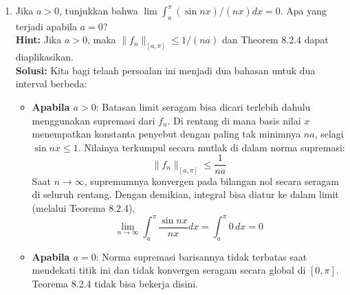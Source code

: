 ﻿\documentclass{article}
\begin{document}
\begin{enumerate}
        \vspace{0.5cm}
  \item[13.] Jika $a > 0$, tunjukkan bahwa $\lim \int_a^\pi (\sin nx) / (nx) dx = 0$. Apa yang terjadi apabila $a=0$?\\
        \textbf{Hint:} Jika $a > 0$, maka $\|f_n\|_{[a, \pi]} \le 1 / (na)$ dan Theorem 8.2.4 dapat diaplikasikan.\\
        \textbf{Solusi:}
        Kita bagi telaah persoalan ini menjadi dua bahasan untuk dua interval berbeda:
        \begin{itemize}
          \item \textbf{Apabila $a > 0$}: Batasan limit seragam bisa dicari terlebih dahulu menggunakan supremasi dari $f_n$. Di rentang di mana basis nilai $x$ menempatkan konstanta penyebut dengan paling tak minimnya $na$, selagi $\sin nx \le 1$. Nilainya terkumpul secara mutlak di dalam norma supremasi:
                \[ \|f_n\|_{[a, \pi]} \le \frac{1}{na} \]
                Saat $n \to \infty$, supremumnya konvergen pada bilangan nol secara seragam di seluruh rentang. Dengan demikian, integral bisa diatur ke dalam limit (melalui Teorema 8.2.4),
                \[ \lim_{n \to \infty} \int_a^\pi \frac{\sin nx}{nx} dx = \int_a^\pi 0 \, dx = 0 \]

          \item \textbf{Apabila $a = 0$}: Norma supremasi barisannya tidak terbatas saat mendekati titik ini dan tidak konvergen seragam secara global di $[0, \pi]$. Teorema 8.2.4 tidak bisa bekerja disini.
        \end{itemize}


\end{enumerate}
\end{document}
